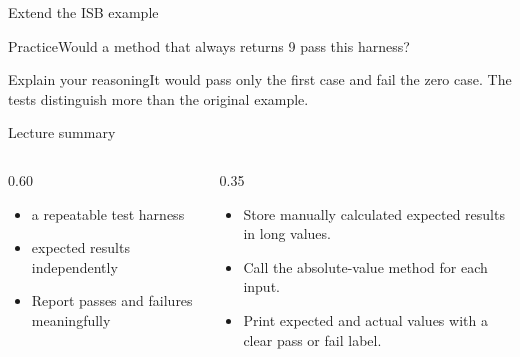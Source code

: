 \documentclass[10pt,aspectratio=169]{beamer}
\begin{document}
\begin{frame}[fragile,t]{Extend the ISB example}
\begin{alertblock}{Practice}Would a method that always returns 9 pass this harness?\end{alertblock}\vspace{3mm}\begin{exampleblock}{Explain your reasoning}It would pass only the first case and fail the zero case. The tests distinguish more than the original example.\end{exampleblock}
\end{frame}
\begin{frame}[fragile,t]{Lecture summary}
\begin{columns}[T,onlytextwidth]\begin{column}{0.60\textwidth}
\begin{itemize}
\item a repeatable test harness
\item expected results independently
\item Report passes and failures meaningfully
\end{itemize}
\end{column}\begin{column}{0.35\textwidth}\small
\begin{itemize}
\item Store manually calculated expected results in long values.
\item Call the absolute-value method for each input.
\item Print expected and actual values with a clear pass or fail label.
\end{itemize}
\end{column}\end{columns}
\end{frame}
\end{document}
